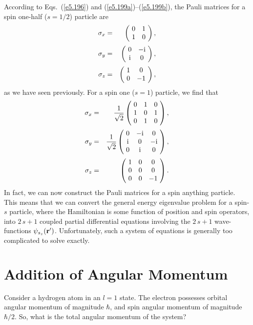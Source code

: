 According to Eqs.~(\ref{e5.196}) and (\ref{e5.199a})--(\ref{e5.199b}), the Pauli matrices for a spin one-half 
($s=1/2$)
particle are 
\begin{eqnarray}
\sigma_x &=& \left(\!\begin{array}{cc} 0 &1\\1&0\end{array}\!\right),\\[0.5ex]
\sigma_y &=& \left(\!\begin{array}{cc} 0 &-{\rm i}\\{\rm i}&0\end{array}\!\right),\\[0.5ex]
\sigma_z &=& \left(\!\begin{array}{cc} 1 &0\\0&-1\end{array}\!\right),
\end{eqnarray}
as we have seen previously. For a spin one ($s=1$) particle, we find that
\begin{eqnarray}
\sigma_x &=&\frac{1}{\sqrt{2}}\left(\!
\begin{array}{ccc} 0 &1&0\\1&0&1\\0&1&0\end{array}\!\right),\\[0.5ex]
\sigma_y &=& \frac{1}{\sqrt{2}}
\left(\!\begin{array}{ccc} 0 &-{\rm i}&0\\{\rm i}&0&{-\rm i}\\
0&{\rm i}& 0\end{array}\!\right),\\[0.5ex]
\sigma_z &=& \left(\!\begin{array}{ccc} 1 &0&0\\0&0&0\\0&0&-1\end{array}\!\right).
\end{eqnarray}
In fact, we can now construct the Pauli matrices for a spin anything particle. 
This means that we can convert the general energy eigenvalue problem for a spin-$s$ particle, where the Hamiltonian is some function of position and spin operators,
into $2\,s+1$ coupled partial differential equations involving the 
$2\,s+1$ wave-functions
$\psi_{s_z}({\bf r'})$. Unfortunately, such a system
of equations is generally too complicated
to solve exactly.

\section{Addition of Angular Momentum}
Consider a hydrogen atom in an $l=1$ state. The electron
possesses orbital angular momentum of magnitude $\hbar$, and spin angular
momentum of magnitude $\hbar/2$. So, what is the total angular momentum of
the system? 

